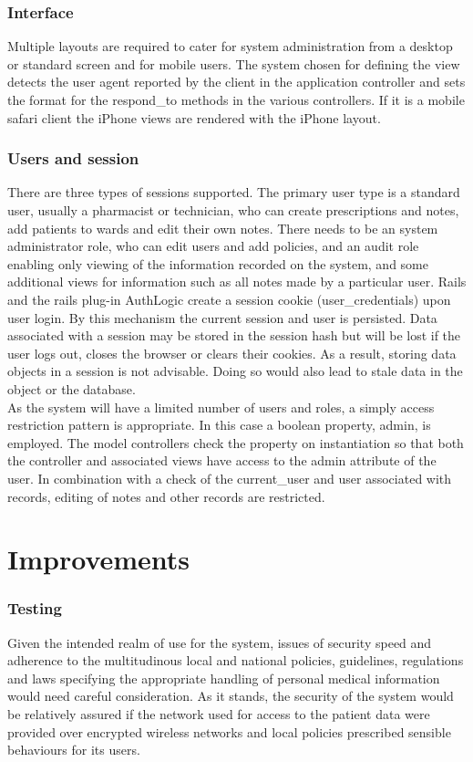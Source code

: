 \documentclass[letterpaper]{amsart}
\begin{document}
\section{Interface}
Multiple layouts are required to cater for system administration from a desktop or standard screen and for mobile users.  The system chosen for defining the view detects the user agent reported by the client in the application controller and sets the format for the respond\_to methods in the various controllers.  If it is a mobile safari client the iPhone views are rendered with the iPhone layout.  
\section{Users and session} 
There are three types of sessions supported.  The primary user type is a standard user, usually a pharmacist or technician, who can create prescriptions and notes, add patients to wards and edit their own notes.  There needs to be an system administrator role, who can edit users and add policies, and an audit role enabling only viewing of the information recorded on the system, and some additional views for information such as all notes made by a particular user.
Rails and the rails plug-in AuthLogic create a session cookie (user\_credentials) upon user login.  By this mechanism the current session and user is persisted.  Data associated with a session may be stored in the session hash but will be lost if the user logs out, closes the browser or clears their cookies.  As a result, storing data objects in a session is not advisable.  Doing so would also lead to stale data in the object or the database.\\
As the system will have a limited number of users and roles, a simply access restriction pattern is appropriate.  In this case a boolean property, admin, is employed.  The model controllers check the property on instantiation so that both the controller and associated views have access to the admin attribute of the user.  In combination with a check of the current\_user and user associated with records, editing of notes and other records are restricted.

\part{Improvements}
\section{Testing} 
Given the intended realm of use for the system, issues of security speed and adherence to the multitudinous local and national policies, guidelines, regulations and laws specifying the appropriate handling of personal medical information would need careful consideration.  As it stands, the security of the system would be relatively assured if the network used for access to the patient data were provided over encrypted wireless networks and local policies prescribed sensible behaviours for its users.
\end{document}
